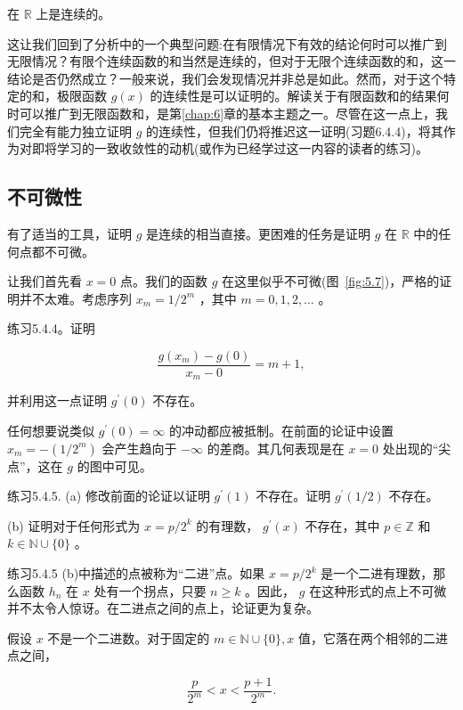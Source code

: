 在 \(\mathbb{R}\) 上是连续的。

这让我们回到了分析中的一个典型问题:在有限情况下有效的结论何时可以推广到无限情况？有限个连续函数的和当然是连续的，但对于无限个连续函数的和，这一结论是否仍然成立？一般来说，我们会发现情况并非总是如此。然而，对于这个特定的和，极限函数 \(g\left( x\right)\) 的连续性是可以证明的。解读关于有限函数和的结果何时可以推广到无限函数和，是第\ref{chap:6}章的基本主题之一。尽管在这一点上，我们完全有能力独立证明 \(g\) 的连续性，但我们仍将推迟这一证明(习题6.4.4)，将其作为对即将学习的一致收敛性的动机(或作为已经学过这一内容的读者的练习)。

\subsection{不可微性}

有了适当的工具，证明 \(g\) 是连续的相当直接。更困难的任务是证明 \(g\) 在 \(\mathbb{R}\) 中的任何点都不可微。

让我们首先看 \(x = 0\) 点。我们的函数 \(g\) 在这里似乎不可微(图~\ref{fig:5.7})，严格的证明并不太难。考虑序列 \({x}_{m} = 1/{2}^{m}\) ，其中 \(m = 0,1,2,\ldots\) 。

练习5.4.4。证明

\[
\frac{g\left( {x}_{m}\right)  - g\left( 0\right) }{{x}_{m} - 0} = m + 1,
\]

并利用这一点证明 \({g}^{\prime }\left( 0\right)\) 不存在。

任何想要说类似 \({g}^{\prime }\left( 0\right)  = \infty\) 的冲动都应被抵制。在前面的论证中设置 \({x}_{m} =  - \left( {1/{2}^{m}}\right)\) 会产生趋向于 \(- \infty\) 的差商。其几何表现是在 \(x = 0\) 处出现的“尖点”，这在 \(g\) 的图中可见。

练习5.4.5. (a) 修改前面的论证以证明 \({g}^{\prime }\left( 1\right)\) 不存在。证明 \({g}^{\prime }\left( {1/2}\right)\) 不存在。

(b) 证明对于任何形式为 \(x = p/{2}^{k}\) 的有理数， \({g}^{\prime }\left( x\right)\) 不存在，其中 \(p \in  \mathbb{Z}\) 和 \(k \in  \mathbb{N} \cup  \{ 0\}\) 。

练习5.4.5 (b)中描述的点被称为“二进”点。如果 \(x = p/{2}^{k}\) 是一个二进有理数，那么函数 \({h}_{n}\) 在 \(x\) 处有一个拐点，只要 \(n \geq  k\) 。因此， \(g\) 在这种形式的点上不可微并不太令人惊讶。在二进点之间的点上，论证更为复杂。

假设 \(x\) 不是一个二进数。对于固定的 \(m \in  \mathbb{N} \cup  \{ 0\} ,x\) 值，它落在两个相邻的二进点之间，

\[
\frac{p}{{2}^{m}} < x < \frac{p + 1}{{2}^{m}}.
\]

